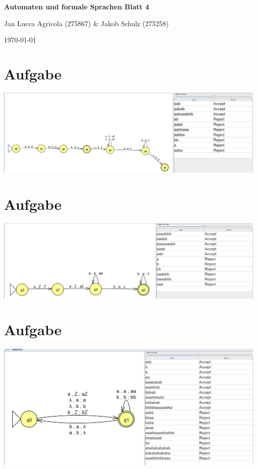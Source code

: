 \documentclass[a4paper,12pt,titlepage]{article}
\begin{document}
\begin{titlepage}
    \centering
    \vspace*{2cm}
    {\LARGE\bfseries Automaten und formale Sprachen Blatt 4\par}
    \vspace{2cm}
    {\Large Jan Lucca Agricola (275867) \& Jakob Schulz (275258)\par}
    \vspace{2cm}
    {\large\today\par}
\end{titlepage}

\section{Aufgabe}
\includegraphics[width=1.0\textwidth]{task1.png}\\
\section{Aufgabe}
\includegraphics[width=1.0\textwidth]{task2.png}\\
\section{Aufgabe}
\includegraphics[width=1.0\textwidth]{task3.png}\\
\end{document}
